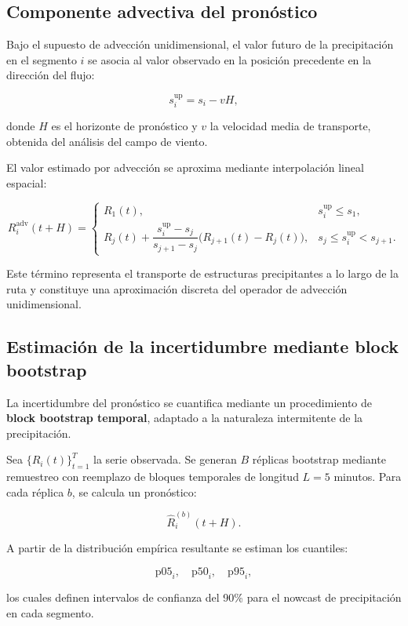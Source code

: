 \documentclass[
  spanish,
  us-letterpaper,
]{scrreprt}
\numberwithin{equation}{section}
\begin{document}
\subsection{Componente advectiva del
pronóstico}\label{componente-advectiva-del-pronuxf3stico-2}

Bajo el supuesto de advección unidimensional, el valor futuro de la
precipitación en el segmento \(i\) se asocia al valor observado en la
posición precedente en la dirección del flujo:

\[
s_i^{\text{up}} = s_i - vH,
\]

donde \(H\) es el horizonte de pronóstico y \(v\) la velocidad media de
transporte, obtenida del análisis del campo de viento.

El valor estimado por advección se aproxima mediante interpolación
lineal espacial:

\[
R_i^{\text{adv}}(t+H) =
\begin{cases}
R_1(t), & s_i^{\text{up}} \le s_1, \\[6pt]
R_j(t) + \dfrac{s_i^{\text{up}} - s_j}{s_{j+1}-s_j}\bigl(R_{j+1}(t)-R_j(t)\bigr), & s_j \le s_i^{\text{up}} < s_{j+1}.
\end{cases}
\]

Este término representa el transporte de estructuras precipitantes a lo
largo de la ruta y constituye una aproximación discreta del operador de
advección unidimensional.

\subsection{Estimación de la incertidumbre mediante block
bootstrap}\label{estimaciuxf3n-de-la-incertidumbre-mediante-block-bootstrap-2}

La incertidumbre del pronóstico se cuantifica mediante un procedimiento
de \textbf{block bootstrap temporal}, adaptado a la naturaleza
intermitente de la precipitación.

Sea \(\{R_i(t)\}_{t=1}^T\) la serie observada. Se generan \(B\) réplicas
bootstrap mediante remuestreo con reemplazo de bloques temporales de
longitud \(L = 5\) minutos. Para cada réplica \(b\), se calcula un
pronóstico:

\[
\hat{R}_i^{(b)}(t+H).
\]

A partir de la distribución empírica resultante se estiman los
cuantiles:

\[
\text{p05}_i, \quad \text{p50}_i, \quad \text{p95}_i,
\]

los cuales definen intervalos de confianza del 90\% para el nowcast de
precipitación en cada segmento.
\end{document}
